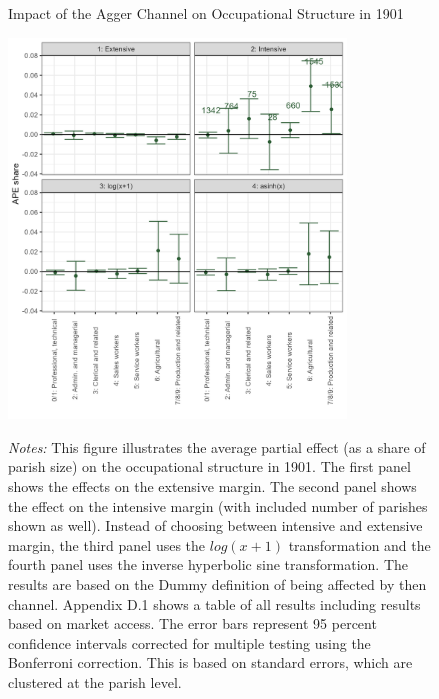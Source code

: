 \documentclass[11pt]{article}
\begin{document}
\begin{figure}
\begin{center}
  \caption{Impact of the Agger Channel on Occupational Structure in 1901} \label{fig:mech_occ}
  \includegraphics[width=0.8\textwidth]{Plots/Mechanism/All_occupations_dummy.png}
  \parbox{0.9\textwidth}{
  \caption*{\footnotesize \textit{Notes:} This figure illustrates the average partial effect (as a share of parish size) on the occupational structure in 1901. The first panel shows the effects on the extensive margin. The second panel shows the effect on the intensive margin (with included number of parishes shown as well). Instead of choosing between intensive and extensive margin, the third panel uses the $log(x+1)$ transformation and the fourth panel uses the inverse hyperbolic sine transformation. The results are based on the Dummy definition of being affected by then channel. Appendix D.1 shows a table of all results including results based on market access. The error bars represent 95 percent confidence intervals corrected for multiple testing using the Bonferroni correction. This is based on standard errors, which are clustered at the parish level.}
}
\end{center}
\end{figure}
\end{document}
